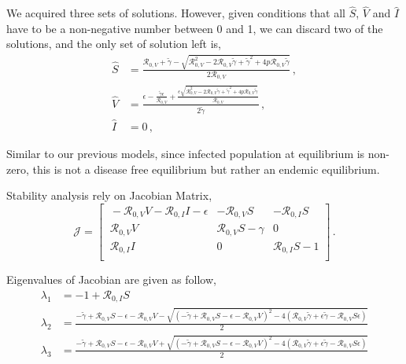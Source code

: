 \documentclass[12pt]{article}
\newcommand{\R}{\mathcal{R}}
\begin{document}
We acquired three sets of solutions. However, given conditions that all $\hat{S}$, $\hat{V}$ and $\hat{I}$ have to be a non-negative number between 0 and 1, we can discard two of the solutions, and the only set of solution left is, 
\begin{subequations}
\begin{align}
\hat{S}&= \frac{\R_{0,V}+\tilde{\gamma}-\sqrt{\R_{0,V}^2-2\R_{0,V}\tilde{\gamma}+\tilde{\gamma}^2+4p\R_{0,V}\tilde{\gamma}}}{2\R_{0,V}}\,, \label{eq:Shat}\\
\hat{V}&= \frac{\epsilon-\frac{\tilde{\gamma}\epsilon}{\R_{0,V}}+\frac{\epsilon\sqrt{\R_{0,V}^2-2\R_{0,V}\tilde{\gamma}+\tilde{\gamma}^2+4p\R_{0,V}\tilde{\gamma}}}{\R_{0,V}}}{2\tilde{\gamma}}\,, \label{eq:Vhat}\\
\hat{I}&=0\,, \label{eq:Ihat}
\end{align}
\end{subequations}

Similar to our previous models, since infected population at equilibrium is non-zero, this is not a disease free equilibrium but rather an endemic equilibrium.

Stability analysis rely on Jacobian Matrix,
\begin{equation}
\mathcal{J} =
\begin{bmatrix}
    \ -\R_{0,V}V-\R_{0,I}I-\epsilon       & -\R_{0,V}S     &-\R_{0,I}S\\
    \ \R_{0,V}V       & \R_{0,V}S-\gamma    &0\\
    \ \R_{0,I}I       &0     &\R_{0,I} S-1\\
\end{bmatrix}\,.
\end{equation}

Eigenvalues of Jacobian are given as follow,
\begin{subequations}
\begin{align}
\lambda_1&=-1+\R_{0,I} S \label{eq:lambda1}\\
\lambda_2&=\frac{-\tilde{\gamma}+\R_{0,V}S-\epsilon-\R_{0,V}V-\sqrt{(-\tilde{\gamma}+\R_{0,V} S-\epsilon-\R_{0,V}V)^2-4(\R_{0,V}\tilde{\gamma}+\epsilon\tilde{\gamma}-\R_{0,V}S\epsilon)}}{2} \label{eq:lambda2}\\
\lambda_3&=\frac{-\tilde{\gamma}+\R_{0,V}S-\epsilon-\R_{0,V}V+\sqrt{(-\tilde{\gamma}+\R_{0,V} S-\epsilon-\R_{0,V}V)^2-4(\R_{0,V}\tilde{\gamma}+\epsilon\tilde{\gamma}-\R_{0,V}S\epsilon)}}{2}\label{eq:lambda3}
\end{align}
\end{subequations}
\end{document}
